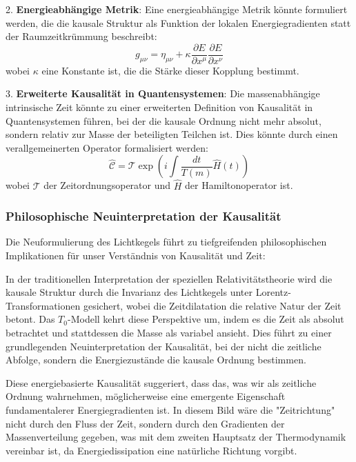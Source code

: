\documentclass[a4paper,12pt]{article}
\begin{document}
2. \textbf{Energieabhängige Metrik}: Eine energieabhängige Metrik könnte formuliert werden, die die kausale Struktur als Funktion der lokalen Energiegradienten statt der Raumzeitkrümmung beschreibt:
\begin{equation}
	g_{\mu\nu} = \eta_{\mu\nu} + \kappa \frac{\partial E}{\partial x^\mu}\frac{\partial E}{\partial x^\nu}
\end{equation}
wobei \( \kappa \) eine Konstante ist, die die Stärke dieser Kopplung bestimmt.

3. \textbf{Erweiterte Kausalität in Quantensystemen}: Die massenabhängige intrinsische Zeit könnte zu einer erweiterten Definition von Kausalität in Quantensystemen führen, bei der die kausale Ordnung nicht mehr absolut, sondern relativ zur Masse der beteiligten Teilchen ist. Dies könnte durch einen verallgemeinerten Operator formalisiert werden:
\begin{equation}
	\hat{\mathcal{C}} = \mathcal{T} \exp\left(i\int \frac{dt}{T(m)} \hat{H}(t)\right)
\end{equation}
wobei \( \mathcal{T} \) der Zeitordnungsoperator und \( \hat{H} \) der Hamiltonoperator ist.

\subsubsection{Philosophische Neuinterpretation der Kausalität}
Die Neuformulierung des Lichtkegels führt zu tiefgreifenden philosophischen Implikationen für unser Verständnis von Kausalität und Zeit:

In der traditionellen Interpretation der speziellen Relativitätstheorie wird die kausale Struktur durch die Invarianz des Lichtkegels unter Lorentz-Transformationen gesichert, wobei die Zeitdilatation die relative Natur der Zeit betont. Das \( T_0 \)-Modell kehrt diese Perspektive um, indem es die Zeit als absolut betrachtet und stattdessen die Masse als variabel ansieht. Dies führt zu einer grundlegenden Neuinterpretation der Kausalität, bei der nicht die zeitliche Abfolge, sondern die Energiezustände die kausale Ordnung bestimmen.

Diese energiebasierte Kausalität suggeriert, dass das, was wir als zeitliche Ordnung wahrnehmen, möglicherweise eine emergente Eigenschaft fundamentalerer Energiegradienten ist. In diesem Bild wäre die "Zeitrichtung" nicht durch den Fluss der Zeit, sondern durch den Gradienten der Massenverteilung gegeben, was mit dem zweiten Hauptsatz der Thermodynamik vereinbar ist, da Energiedissipation eine natürliche Richtung vorgibt.
\end{document}
